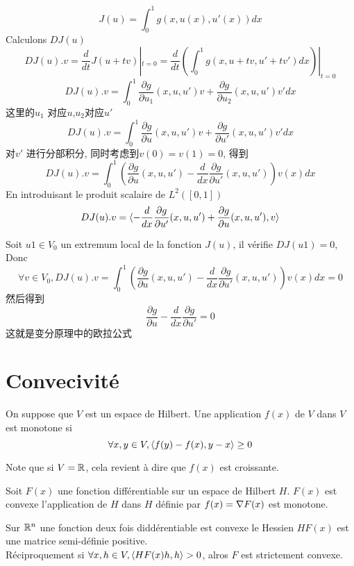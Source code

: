 \begin{example}
$$J(u) = \int_0^1 g(x,u(x),u'(x))dx$$
Calculons $DJ(u)$
$$
DJ(u).v 
= \frac{d}{dt}J(u+tv)|_{t=0}
=\frac{d}{dt}(\int_0^1 g(x,u+tv,u'+tv')dx)|_{t=0}
$$
$$
DJ(u).v 
=\int_0^1 \frac{\partial g}{\partial u_1}(x,u,u')v + \frac{\partial g}{\partial u_2}(x,u,u')v' dx
$$
这里的$u_1$ 对应$u$,$u_2$对应$u'$
$$
DJ(u).v 
=\int_0^1 \frac{\partial g}{\partial u}(x,u,u')v + \frac{\partial g}{\partial u'}(x,u,u')v' dx
$$
对$v'$ 进行分部积分, 同时考虑到$v(0)=v(1)=0$, 得到
$$
DJ(u).v 
=\int_0^1 (\frac{\partial g}{\partial u}(x,u,u') - \frac{d}{dx}\frac{\partial g}{\partial u'}(x,u,u'))v(x) dx
$$
En introduisant le produit scalaire de $L^2([0,1])$
$$
DJ(u).v 
= \langle -\frac{d}{dx}\frac{\partial g}{\partial u'}(x,u,u')+\frac{\partial g}{\partial u}(x,u,u') , v\rangle
$$

Soit $u1 \in V_0$ un extremum local de la fonction $J(u)$, il v\'erifie $DJ(u1) = 0$, Donc
$$
\forall v \in V_0, DJ(u).v = \int_0^1 (\frac{\partial  g}{\partial u}(x,u,u') - \frac{d}{dx}\frac{\partial g}{\partial u'}(x,u,u'))v(x) dx = 0
$$
然后得到
$$
\frac{\partial g}{\partial u} - \frac{d}{dx}\frac{\partial g}{\partial u'} = 0
$$
这就是变分原理中的欧拉公式
\end{example}

\section{Convecivit\'e}
\begin{definition}
		On suppose que $V$ est un espace de Hilbert. Une application $f(x)$ de $V$ dans $V$ est monotone si
		$$
		\forall x,y \in V, \langle f(y)-f(x) , y-x\rangle \geq 0
		$$
\end{definition}
Note que si $V=\mathbb{R}$, cela revient \`a dire que $f(x)$ est croissante.

\begin{theorem}
		Soit $F(x)$ une fonction diff\'erentiable sur un espace de Hilbert $H$. $F(x)$ est convexe \ssi l'application de $H$ dans $H$ d\'efinie par $f(x) = \nabla F(x)$ est monotone.
\end{theorem}

\begin{theorem}
		Sur $\mathbb{R}^n$ une fonction deux fois didd\'erentiable est convexe \ssi le Hessien $HF(x)$ est une matrice semi-d\'efinie positive.\\
		R\'eciproquement si $\forall x,h \in V, \langle HF(x)h , h\rangle>0$, alros $F$ est strictement convexe.
\end{theorem}

